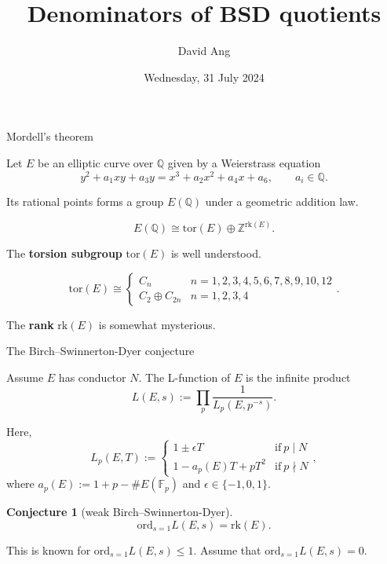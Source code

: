 \documentclass[10pt]{beamer}
\title{Denominators of BSD quotients}
\author{David Ang}
\institute{London School of Geometry and Number Theory}
\date{Wednesday, 31 July 2024}
\newtheorem{conjecture}{Conjecture}
\begin{document}
\frame{\titlepage}

\begin{frame}[t]{Mordell's theorem}

Let $ E $ be an elliptic curve over $ \mathbb{Q} $ given by a Weierstrass equation
$$ y^2 + a_1xy + a_3y = x^3 + a_2x^2 + a_4x + a_6, \qquad a_i \in \mathbb{Q}. $$

\pause

Its rational points forms a group $ E(\mathbb{Q}) $ under a geometric addition law.

\begin{theorem}[Mordell]
\vspace{-0.3cm} $$ E(\mathbb{Q}) \cong \mathrm{tor}(E) \oplus \mathbb{Z}^{\mathrm{rk}(E)}. $$
\end{theorem}

\pause

\vspace{0.3cm} The \textbf{torsion subgroup} $ \mathrm{tor}(E) $ is well understood.

\begin{theorem}[Mazur]
\vspace{-0.2cm} $$ \mathrm{tor}(E) \cong \begin{cases}
C_n & n = 1, 2, 3, 4, 5, 6, 7, 8, 9, 10, 12 \\
C_2 \oplus C_{2n} & n = 1, 2, 3, 4
\end{cases}. $$
\end{theorem}

\pause

\vspace{0.2cm} The \textbf{rank} $ \mathrm{rk}(E) $ is somewhat mysterious.

\end{frame}

\begin{frame}[t]{The Birch--Swinnerton-Dyer conjecture}

Assume $ E $ has conductor $ N $. The L-function of $ E $ is the infinite product
$$ L(E, s) := \prod_p \dfrac{1}{L_p(E, p^{-s})}. $$

\pause

Here,
$$ L_p(E, T) := \begin{cases}
1 \pm \epsilon T & \text{if} \ p \mid N \\
1 - a_p(E)T + pT^2 & \text{if} \ p \nmid N
\end{cases}, $$
where $ a_p(E) := 1 + p - \#E(\mathbb{F}_p) $ and $ \epsilon \in \{-1, 0, 1\} $.

\pause

\vspace{0.5cm}

\begin{conjecture}[weak Birch--Swinnerton-Dyer]
\vspace{-0.3cm} $$ \mathrm{ord}_{s = 1} L(E, s) = \mathrm{rk}(E). $$
\end{conjecture}

\pause

\vspace{0.3cm} This is known for $ \mathrm{ord}_{s = 1} L(E, s) \le 1 $. Assume that $ \mathrm{ord}_{s = 1} L(E, s) = 0 $.

\end{frame}
\end{document}
